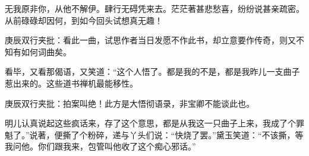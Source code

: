 \begin{parag}


    无我原非你，从他不解伊。肆行无碍凭来去。茫茫著甚悲愁喜，纷纷说甚亲疏密。从前碌碌却因何，到如今回头试想真无趣！\begin{note}庚辰双行夹批：看此一曲，试思作者当日发愿不作此书，却立意要作传奇，则又不知有如何词曲矣。\end{note}
\end{parag}


\begin{parag}


    看毕，又看那偈语，又笑道：“这个人悟了。都是我的不是，都是我昨儿一支曲子惹出来的。这些道书禅机最能移性。\begin{note}庚辰双行夹批：拍案叫绝！此方是大悟彻语录，非宝卿不能谈此也。\end{note}明儿认真说起这些疯话来，存了这个意思，都是从我这一只曲子上来，我成了个罪魁了。”说著，便撕了个粉碎，递与丫头们说：“快烧了罢。”黛玉笑道：“不该撕，等我问他。你们跟我来，包管叫他收了这个痴心邪话。”
\end{parag}


